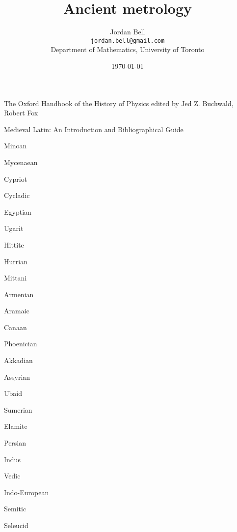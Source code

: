 \documentclass{article}
\theoremstyle{definition}
\begin{document}
\title{Ancient metrology}
\author{Jordan Bell\\ \texttt{jordan.bell@gmail.com}\\Department of Mathematics, University of Toronto}
\date{\today}
\maketitle


The Oxford Handbook of the History of Physics
edited by Jed Z. Buchwald, Robert Fox

Medieval Latin: An Introduction and Bibliographical Guide


Minoan

Mycenaean

Cypriot

Cycladic

Egyptian

Ugarit

Hittite

Hurrian

Mittani

Armenian

Aramaic

Canaan

Phoenician

Akkadian

Assyrian

Ubaid

Sumerian

Elamite

Persian

Indus

Vedic

Indo-European

Semitic





Seleucid



\end{document}
